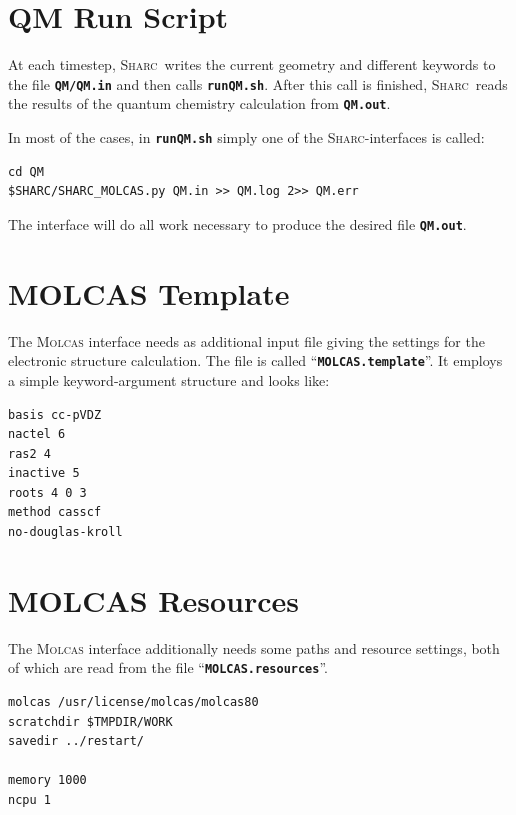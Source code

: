 \documentclass[a4paper,11pt,DIV=15,openany]{scrbook}
\newcommand{\sharc}{\textsc{Sharc}}
\newcommand{\ttt}[1]{\textbf{\texttt{#1}}}
\newenvironment{example}{
  \vspace{0mm}
  \definecolor{shadecolor}{HTML}{E4F4FF}
  \begin{shaded}
}{
  \end{shaded}
}
\begin{document}
\section{QM Run Script}

At each timestep, \sharc\ writes the current geometry and different keywords to the file \ttt{QM/QM.in} and then calls \ttt{runQM.sh}. 
After this call is finished, \sharc\ reads the results of the quantum chemistry calculation from \ttt{QM.out}.

In most of the cases, in \ttt{runQM.sh} simply one of the \sharc-interfaces is called:
\begin{example}\vspace{-8mm}
\begin{verbatim}
cd QM
$SHARC/SHARC_MOLCAS.py QM.in >> QM.log 2>> QM.err
\end{verbatim}\vspace{-5mm}
\end{example}
The interface will do all work necessary to produce the desired file \ttt{QM.out}.

\section{MOLCAS Template}

The \textsc{Molcas} interface needs as additional input file giving the settings for the electronic structure calculation. 
The file is called ``\ttt{MOLCAS.template}''.
It employs a simple keyword-argument structure and looks like:
\begin{example}\vspace{-8mm}
\begin{verbatim}
basis cc-pVDZ
nactel 6
ras2 4
inactive 5
roots 4 0 3
method casscf
no-douglas-kroll
\end{verbatim}\vspace{-5mm}
\end{example}

\section{MOLCAS Resources}

The \textsc{Molcas} interface additionally needs some paths and resource settings, both of which are read from the file  ``\ttt{MOLCAS.resources}''.
\begin{example}\vspace{-8mm}
\begin{verbatim}
molcas /usr/license/molcas/molcas80
scratchdir $TMPDIR/WORK
savedir ../restart/

memory 1000
ncpu 1
\end{verbatim}\vspace{-5mm}
\end{example}
\end{document}

